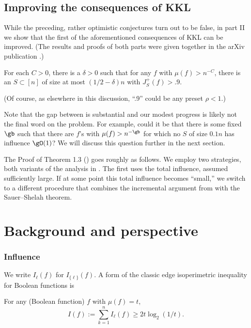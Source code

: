 \subsection *{Improving the consequences of KKL}

While the preceding, rather optimistic conjectures turn out to be false, 
in part II  we show
that the first of the aforementioned consequences of KKL can be 
improved. (The results and proofs of both parts were given together in
the arXiv publication \cite {BKK21}.) 
%
%

\noindent
\begin{thm}\label{prop3}

For each $C>0$, there is a $\delta>0$ such that for any $f$ with 
$\mu(f) >n^{-C}$, there
is an $S\subset [n]$ of size at most $(1/2-\delta)n$ with $J_{S}^{+}(f)>.9.$
\end {thm}
\nin
(Of course, as elsewhere in this discussion, ``.9'' could be any preset $\rho <1$.)

Note that the gap between   is substantial 
and our modest progress is likely not the final word on the problem.
For example, could it be that there is some fixed $\gb$ such that there
are $f$'s with %
%
%
$\mu(f) > n^{-\gb}$ for which no $S$ of size $0.1 n$ has influence $\gO(1)$?
We will discuss this question further in the next section.


%
%
%
The Proof of Theorem 1.3 (\cite {BKK21}) goes roughly as follows.
We employ two strategies, both variants of the analysis in \cite{kkl}.
The first 
uses the total influence, assumed sufficiently large.
If at some point this total influence becomes ``small,'' 
we switch to a different procedure that
combines the incremental argument from \cite{kkl} with the 
Sauer--Shelah %
theorem.  %

\section {Background and perspective}
\label{s:bac}

\subsubsection *{Influence}

We write $I_\ell (f)$ for $I_{\{\ell\}}(f)$.  A form of
the classic edge isoperimetric inequality for Boolean
functions is  
%

\begin{thm}\label{Tiso}
For any (Boolean function) $f$ %
%
 with $\mu(f) =t$,
\begin {equation}
\label {e:harper}
I(f) := \sum_{k=1}^n  I_\ell (f) \ge  2t \log_2 (1/t).
\end {equation}
\end {thm}

